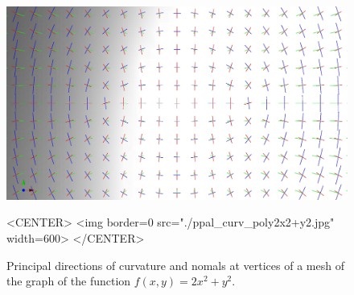 \begin{figure}[!ht]
\begin{ccTexOnly}
\centerline{
\includegraphics[width=.5\linewidth]{Jet_fitting_3/ppal_curv_poly2x2+y2}}
\end{ccTexOnly}
\caption{Principal directions of curvature and nomals at vertices of a mesh of the
 graph of the function $f(x,y)=2x^2+y^2$.}

\begin{ccHtmlOnly}
<CENTER> <img border=0 src="./ppal_curv_poly2x2+y2.jpg" width=600>
</CENTER>
\end{ccHtmlOnly}
\end{figure}

